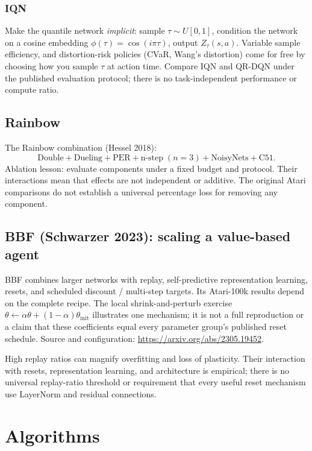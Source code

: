 \documentclass[11pt,oneside]{scrbook}
\begin{document}
\subsection{IQN}

Make the quantile network \emph{implicit}: sample $\tau \sim U[0,1]$, condition the
network on a cosine embedding $\phi(\tau) = \cos(i\pi\tau)$, output $Z_\tau(s,a)$.
Variable sample efficiency, and distortion-risk policies (CVaR, Wang's distortion) come
for free by choosing how you sample $\tau$ at action time. Compare IQN and QR-DQN under the published evaluation protocol;
there is no task-independent performance or compute ratio.

\section{Rainbow}

The Rainbow combination (Hessel 2018):
\[
  \text{Double} + \text{Dueling} + \text{PER} + \text{n-step}\;(n=3) + \text{NoisyNets} + \text{C51}.
\]
Ablation lesson: evaluate components under a fixed budget and protocol.
Their interactions mean that effects are not independent or additive.
The original Atari comparisons do not establish a universal percentage
loss for removing any component.

\section{BBF (Schwarzer 2023): scaling a value-based agent}
BBF combines larger networks with replay, self-predictive representation
learning, resets, and scheduled discount / multi-step targets. Its Atari-100k
results depend on the complete recipe. The local shrink-and-perturb exercise
$\theta\leftarrow\alpha\theta+(1-\alpha)\theta_{\mathrm{init}}$ illustrates
one mechanism; it is not a full reproduction or a claim that these
coefficients equal every parameter group's published reset schedule.
Source and configuration: \url{https://arxiv.org/abs/2305.19452}.

\begin{pitfall}
High replay ratios can magnify overfitting and loss of plasticity. Their
interaction with resets, representation learning, and architecture is
empirical; there is no universal replay-ratio threshold or requirement
that every useful reset mechanism use LayerNorm and residual connections.
\end{pitfall}

\chapter{Algorithms}
\end{document}
